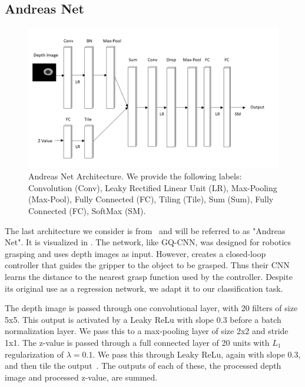 \subsection{Andreas Net}

\begin{figure}[t!]
    \includegraphics[width=0.99\columnwidth]{figs/andreas_net.png}
\caption{Andreas Net Architecture. We provide the following labels: Convolution (Conv), Leaky Rectified Linear Unit (LR), Max-Pooling (Max-Pool),  Fully Connected (FC), Tiling (Tile), Sum (Sum), Fully Connected (FC), SoftMax (SM).} \label{fig:andreas_net}
\end{figure}

The last architecture we consider is from~\cite{viereck2017learning} and will be referred to as "Andreas Net". 
It is visualized in . 
The network, like GQ-CNN, was designed for robotics grasping and uses depth images as input. 
However, \cite{viereck2017learning} creates a closed-loop controller that guides the gripper to the object to be grasped. 
Thus their CNN learns the distance to the nearest grasp function used by the controller. 
Despite its original use as a regression network, we adapt it to our classification task. 

The depth image is passed through one convolutional layer, with 20 filters of size 5x5. 
This output is activated by a Leaky ReLu with slope 0.3 before a batch normalization layer. 
We pass this to a max-pooling layer of size 2x2 and stride 1x1. 
The z-value is passed through a full connected layer of 20 units with $L_{1}$ regularization of $\lambda=0.1$.
We pass this through Leaky ReLu, again with slope 0.3, and then tile the output~\cite{ngiam2010tiled}.
The outputs of each of these, the processed depth image and processed z-value, are summed.

